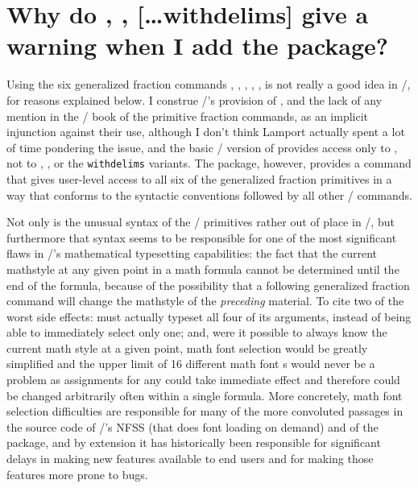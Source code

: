 \documentclass{amsdtx}
\begin{document}
\section{Why do , ,  [\dots{\ntt withdelims}]
 give a warning when I add the  package?}

Using the six generalized fraction commands ,
, , , ,
 is not really a good idea in \latex/, for reasons
explained below. I construe \latex/'s provision of , and the
lack of any mention in the \latex/ book of the primitive fraction
commands, as an implicit injunction against their use, although I don't
think Lamport actually spent a lot of time pondering the issue, and the
basic \latex/ version of  provides access only to ,
not to , , or the \verb'withdelims' variants. The
 package, however, provides a  command that
gives user-level access to all six of the generalized fraction
primitives in a way that conforms to the syntactic conventions followed
by all other \latex/ commands.

Not only is the unusual syntax of the \tex/ primitives rather out of
place in \latex/, but furthermore that syntax seems to be responsible
for one of the most significant flaws in \tex/'s mathematical
typesetting capabilities: the fact that the current mathstyle at any
given point in a math formula cannot be determined until the end of the
formula, because of the possibility that a following generalized
fraction command will change the mathstyle of the \emph{preceding}
material. To cite two of the worst side effects:  must
actually typeset all four of its arguments, instead of being able to
immediately select only one; and, were it possible to always know the
current math style at a given point, math font selection would be
greatly simplified and the upper limit of 16 different math font
s would never be a problem as 
assignments for any  could take immediate effect and therefore
could be changed arbitrarily often within a single formula. More
concretely, math font selection difficulties are responsible for many of
the more convoluted passages in the source code of \latex/'s NFSS (that
does font loading on demand) and of the  package, and by
extension it has historically been responsible for significant delays in
making new features available to end users and for making those features
more prone to bugs.
\end{document}
